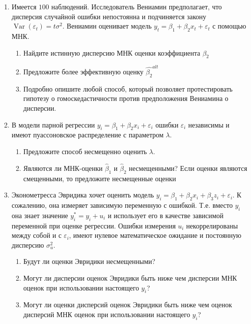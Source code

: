 \documentclass[12pt,a4paper]{article}
\DeclareMathOperator{\Var}{Var}
\newcommand{\hb}{\hat{\beta}}
\newcommand{\e}{\varepsilon}
\begin{document}
\begin{enumerate}
\item Имеется $100$ наблюдений. Исследователь Вениамин предполагает, что дисперсия случайной ошибки непостоянна и подчиняется закону $\Var(\e_t)=t\sigma^2$. Вениамин оценивает модель $y_t=\beta_1 + \beta_2 x_t +\varepsilon_t$ с помощью МНК.
\begin{enumerate}
\item Найдите истинную дисперсию МНК оценки коэффициента $\beta_2$
\item Предложите более эффективную оценку $\hat{\beta_2}^{alt}$
\item Подробно опишите любой способ, который позволяет протестировать гипотезу о гомоскедастичности против предположения Вениамина о дисперсии.
\end{enumerate}
\newpage

\item В модели парной регрессии $y_i=\beta_1+\beta_2 x_i +\e_i$ ошибки $\e_i$ независимы и имеют пуассоновское распределение с параметром $\lambda$.
\begin{enumerate}
\item Предложите способ несмещенно оценить $\lambda$.
\item Являются ли МНК-оценки $\hb_1$ и $\hb_2$ несмещенными? Если оценки являются смещенными, то предложите несмещенные оценки
\end{enumerate}


\item Эконометресса Эвридика хочет оценить модель $y_i=\beta_1 + \beta_2 x_i +\beta_3 z_i + \e_i$. К сожалению, она измеряет зависимую переменную с ошибкой. Т.е. вместо $y_i$ она знает значение $y_i^*=y_i+u_i$ и использует его в качестве зависимой переменной при оценке регрессии. Ошибки измерения $u_i$ некоррелированы между собой и с $\e_i$, имеют нулевое математическое ожидание и постоянную дисперсию $\sigma^2_u$.
\begin{enumerate}
\item Будут ли оценки Эвридики несмещенными?
\item Могут ли дисперсии оценок Эвридики быть ниже чем дисперсии МНК оценок при использовании настоящего $y_i$?
\item Могут ли оценки дисперсий оценок Эвридики быть ниже чем оценок дисперсий МНК оценок при использовании настоящего $y_i$?
\end{enumerate}


\end{enumerate}
\end{document}
